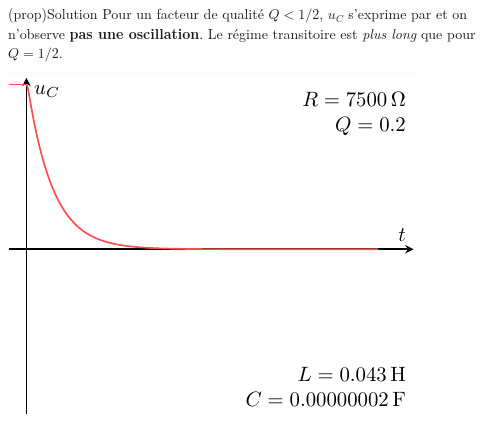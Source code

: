 \documentclass[../../main/main.tex]{subfiles}
\begin{document}
\begin{tcb}[label=prop:solupseudoper, sidebyside](prop){Solution}
	Pour un facteur de qualité $Q < 1/2$, $u_C$ s'exprime par
	\psw{
		\[
			\boxed{
				u_C(t) =
				\frac{E}{r_+-r_-} \left( r_+\exp(r_-t) - r_-\exp(r_+t) \right)
			}
		\]
	}
	et on n'observe \textbf{pas une oscillation}. Le régime transitoire est
	\textit{plus long} que pour $Q = 1/2$.
	\tcblower
	\begin{center}
		\includegraphics[width=\linewidth]{carac-rlc-02}
	\end{center}
\end{tcb}
\end{document}

